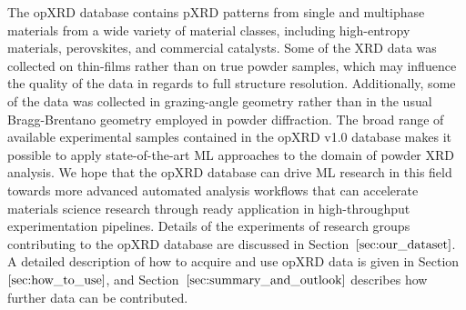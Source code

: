 The opXRD database contains pXRD patterns from single and multiphase materials from a wide variety of material classes, including high-entropy materials, perovskites, and commercial catalysts. Some of the XRD data was collected on thin-films rather than on true powder samples, which may influence the quality of the data in regards to full structure resolution. Additionally, some of the data was collected in grazing-angle geometry rather than in the usual Bragg-Brentano geometry employed in powder diffraction.
The broad range of available experimental samples contained in the opXRD v1.0 database makes it possible to apply state-of-the-art ML approaches to the domain of powder XRD analysis. We hope that the opXRD database can drive ML research in this field towards more advanced automated analysis workflows that can accelerate materials science research through ready application in high-throughput experimentation pipelines. Details of the experiments of research groups contributing to the opXRD database are discussed in Section~$\eqref{sec:our_dataset}$. A detailed description of how to acquire and use opXRD data is given in Section~$\eqref{sec:how_to_use}$, and Section~$\eqref{sec:summary_and_outlook}$ describes how further data can be contributed.